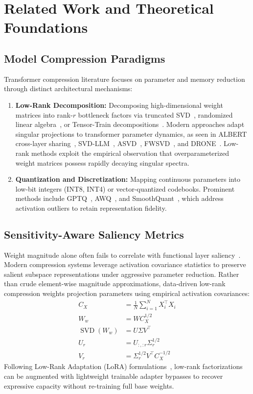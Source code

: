 \section{Related Work and Theoretical Foundations}

\subsection{Model Compression Paradigms}
Transformer compression literature focuses on parameter and memory reduction through distinct architectural mechanisms:
\begin{enumerate}
\item \textbf{Low-Rank Decomposition:} Decomposing high-dimensional weight matrices into rank-$r$ bottleneck factors via truncated SVD~\citep{eckart1936}, randomized linear algebra~\citep{halko2011}, or Tensor-Train decompositions~\citep{novikov2015tensor}. Modern approaches adapt singular projections to transformer parameter dynamics, as seen in ALBERT cross-layer sharing~\citep{lan2020albert}, SVD-LLM~\citep{wang2024svdllm}, ASVD~\citep{yuan2023asvd}, FWSVD~\citep{hsu2022fwsvd}, and DRONE~\citep{chen2021drone}. Low-rank methods exploit the empirical observation that overparameterized weight matrices possess rapidly decaying singular spectra.
\item \textbf{Quantization and Discretization:} Mapping continuous parameters into low-bit integers (INT8, INT4) or vector-quantized codebooks. Prominent methods include GPTQ~\citep{frantar2023gptq}, AWQ~\citep{lin2024awq}, and SmoothQuant~\citep{xiao2023smoothquant}, which address activation outliers to retain representation fidelity.
\end{enumerate}

\subsection{Sensitivity-Aware Saliency Metrics}
Weight magnitude alone often fails to correlate with functional layer saliency~\citep{kirkpatrick2017, molchanov2019}. Modern compression systems leverage activation covariance statistics to preserve salient subspace representations under aggressive parameter reduction. Rather than crude element-wise magnitude approximations, data-driven low-rank compression weights projection parameters using empirical activation covariances:
\begin{align}
C_X &= \frac{1}{N} \sum_{i=1}^N X_i^\top X_i \\
W_w &= W C_X^{1/2} \\
\operatorname{SVD}(W_w) &= U \Sigma V^\top \\
U_r &= U_{:, :r} \Sigma_r^{1/2} \\
V_r &= \Sigma_r^{1/2} V^\top C_X^{-1/2}
\end{align}
Following Low-Rank Adaptation (LoRA) formulations~\citep{hu2022lora}, low-rank factorizations can be augmented with lightweight trainable adapter bypasses to recover expressive capacity without re-training full base weights.


